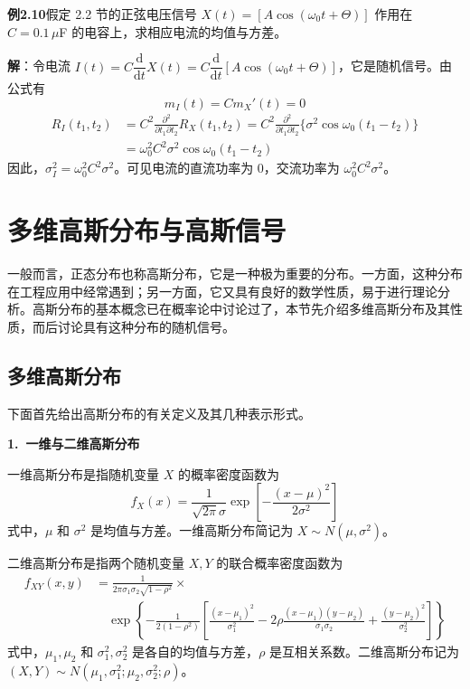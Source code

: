 \documentclass[11pt,openany,UTF8]{ctexbook}
\newcommand{\dif}{\mathrm{d}}                      %
\newcommand{\bhead}[1]{\par\medskip\noindent\textbf{#1}\par\smallskip}
\begin{document}
\begin{examplebox}
\textbf{例2.10}\quad 假定 2.2 节的正弦电压信号 $X(t)=[A\cos(\omega_0 t+\Theta)]$ 作用在 $C=0.1\,\mu$F 的电容上\nobreak，求相应电流的均值与方差\nobreak。

\textbf{解}\nobreak：令电流 $I(t)=C\dfrac{\dif}{\dif t}X(t)=C\dfrac{\dif}{\dif t}[A\cos(\omega_0 t+\Theta)]$\nobreak，它是随机信号\nobreak。由公式有
\[
m_I(t)=Cm_X'(t)=0
\]
\[
\begin{aligned}
R_I(t_1,t_2)&=C^2\frac{\partial^2}{\partial t_1\partial t_2}R_X(t_1,t_2)=C^2\frac{\partial^2}{\partial t_1\partial t_2}\{\sigma^2\cos\omega_0(t_1-t_2)\}\\
&=\omega_0^2C^2\sigma^2\cos\omega_0(t_1-t_2)
\end{aligned}
\]
因此\nobreak，$\sigma_I^2=\omega_0^2C^2\sigma^2$\nobreak。可见电流的直流功率为 0\nobreak，交流功率为 $\omega_0^2C^2\sigma^2$\nobreak。
\end{examplebox}

\section{多维高斯分布与高斯信号}
一般而言\nobreak，正态分布也称高斯分布\nobreak，它是一种极为重要的分布\nobreak。一方面\nobreak，这种分布在工程应用中经常遇到\nobreak；另一方面\nobreak，它又具有良好的数学性质\nobreak，易于进行理论分析\nobreak。高斯分布的基本概念已在概率论中讨论过了\nobreak，本节先介绍多维高斯分布及其性质\nobreak，而后讨论具有这种分布的随机信号\nobreak。

\subsection{多维高斯分布}
下面首先给出高斯分布的有关定义及其几种表示形式\nobreak。

\bhead{1.\ 一维与二维高斯分布}
一维高斯分布是指随机变量 $X$ 的概率密度函数为
\begin{equation}
f_X(x)=\frac{1}{\sqrt{2\pi}\sigma}\exp\left[-\frac{(x-\mu)^2}{2\sigma^2}\right]
\label{eq:2.24}
\end{equation}
式中\nobreak，$\mu$ 和 $\sigma^2$ 是均值与方差\nobreak。一维高斯分布简记为 $X\sim N(\mu,\sigma^2)$\nobreak。

二维高斯分布是指两个随机变量 $X,Y$ 的联合概率密度函数为
\begin{equation}
\begin{aligned}
f_{XY}(x,y)&=\frac{1}{2\pi\sigma_1\sigma_2\sqrt{1-\rho^2}}\times\\
&\quad\exp\left\{-\frac{1}{2(1-\rho^2)}\left[\frac{(x-\mu_1)^2}{\sigma_1^2}-2\rho\frac{(x-\mu_1)(y-\mu_2)}{\sigma_1\sigma_2}+\frac{(y-\mu_2)^2}{\sigma_2^2}\right]\right\}
\end{aligned}
\label{eq:2.25}
\end{equation}
式中\nobreak，$\mu_1,\mu_2$ 和 $\sigma_1^2,\sigma_2^2$ 是各自的均值与方差\nobreak，$\rho$ 是互相关系数\nobreak。二维高斯分布记为 $(X,Y)\sim N(\mu_1,\sigma_1^2;\mu_2,\sigma_2^2;\rho)$\nobreak。
\end{document}
